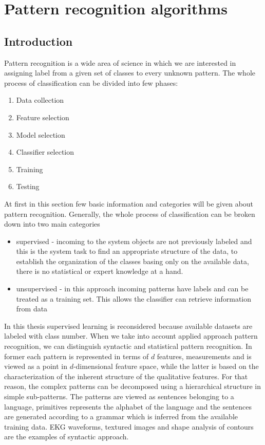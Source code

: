 \section{Pattern recognition algorithms}
\label{cha:Introduction}
\subsection{Introduction}
Pattern recognition is a wide area of science in which we are interested in
assigning label from a given set of classes to every unknown pattern. The whole 
process of classification can be divided into few phases:
\begin{enumerate}
    \item Data collection
    \item Feature selection
    \item Model selection
    \item Classifier selection
    \item Training 
    \item Testing
\end{enumerate}
At first in this section few basic information and categories will be given 
about pattern recognition. Generally, the whole process of classification
can be broken down into two main categories
\begin{itemize}
    \item supervised - incoming to the system objects are not previously
        labeled and this is the system task to find an appropriate structure of
        the data, to establish the organization of the classes basing only on
        the available data, there is no statistical or expert knowledge at a
        hand.
    \item unsupervised - in this approach incoming patterns have labels and can
        be treated as a training set. This allows the classifier can retrieve
        information from data 
\end{itemize}
In this thesis supervised learning is reconsidered because available datasets 
are labeled with class number. When we take into account applied approach
pattern recognition, we can distinguish syntactic and statistical 
pattern recognition. In former each pattern is represented in terms of 
$d$ features, measurements and is viewed as a point in
$d$-dimensional feature space, while the latter
is  based on the characterization of the inherent structure of the 
qualitative features. For that  reason, the complex patterns can be
decomposed using a hierarchical structure in simple  sub-patterns.
The patterns are viewed as sentences belonging to a language, primitives
represents the alphabet of the language and the sentences are generated
according to a grammar which is inferred from the available training data.
EKG waveforms, textured images and shape analysis of contours are the examples
of syntactic approach.


